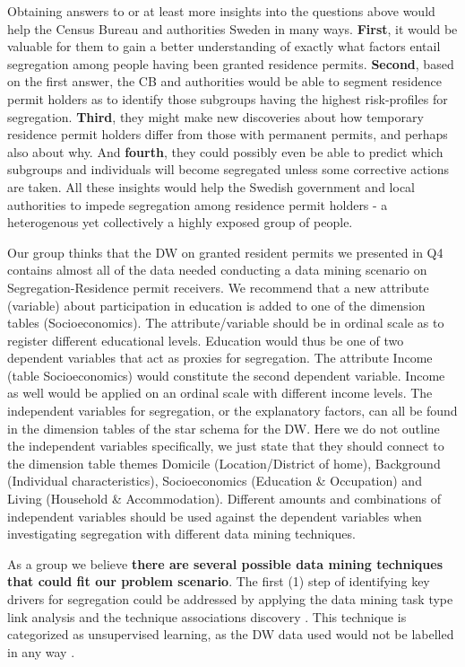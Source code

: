 Obtaining answers to or at least more insights into the questions above would help the Census Bureau and authorities Sweden in many ways.
\textbf{First}, it would be valuable for them to gain a better understanding of exactly what factors entail segregation among people 
having been granted residence permits. 
\textbf{Second}, based on the first answer, 
the CB and authorities would be able to segment residence permit holders as to identify those subgroups having 
the highest risk-profiles for segregation. 
\textbf{Third}, they might make new discoveries about how temporary residence permit holders differ from those with permanent permits, 
and perhaps also about why. And \textbf{fourth}, they could possibly even be able to predict which subgroups and individuals will 
become segregated unless some corrective actions are taken. 
All these insights would help the Swedish government and local authorities to impede segregation among residence permit holders - 
a heterogenous yet collectively a highly exposed group of people.  

Our group thinks that the DW on granted resident permits we presented in Q4 contains almost all of the data needed conducting a data mining
scenario on Segregation-Residence permit receivers. 
We recommend that a new attribute (variable) about participation in education is added to one of the dimension tables (Socioeconomics). 
The attribute/variable should be in ordinal scale as to register different educational levels. 
Education would thus be one of two dependent variables that act as proxies for segregation. 
The attribute Income (table Socioeconomics) would constitute the second dependent variable. 
Income as well would be applied on an ordinal scale with different income levels. 
The independent variables for segregation, or the explanatory factors, 
can all be found in the dimension tables of the star schema for the DW. 
Here we do not outline the independent variables specifically, 
we just state that they should connect to the dimension table themes Domicile (Location/District of home), 
Background (Individual characteristics), Socioeconomics (Education \& Occupation) and Living (Household \& Accommodation).
Different amounts and combinations of independent variables should be used against the dependent variables when 
investigating segregation with different data mining techniques.  

As a group we believe \textbf{there are several possible data mining techniques that could fit our problem scenario}. 
The first (1) step of identifying key drivers for segregation could be addressed by applying the data mining task type link analysis and 
the technique associations discovery \cite[chapter~34.2]{CourseLitt}. 
This technique is categorized as unsupervised learning,
as the DW data used would not be labelled in any way \cite{l6video}.  


